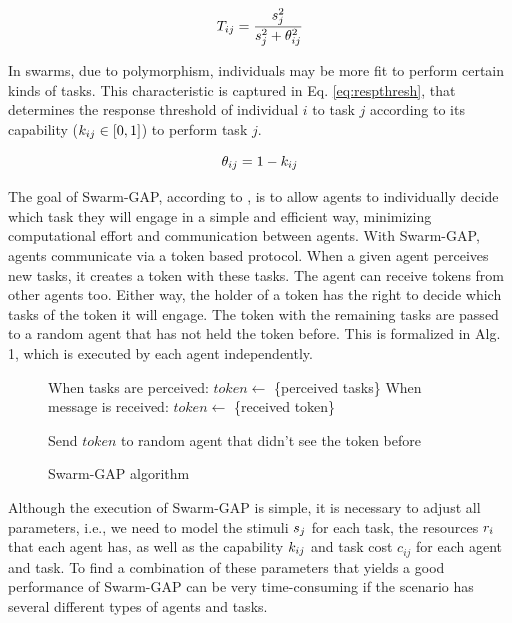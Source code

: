 \documentclass[conference]{IEEEtran}
\begin{document}
\begin{equation}
\label{eq:tendency}
\tendency{i}{j} = \frac{\stimulus{j}^2}{\stimulus{j}^2 + \respthresh{i}{j}^2}
\end{equation}

In swarms, due to polymorphism, individuals may be more fit to perform certain kinds of tasks. This characteristic is captured in Eq. \ref{eq:respthresh}, that determines the response threshold of individual $i$ to task $j$ according to its capability ($k_{ij} \in [0,1]$) to perform task $j$.

\begin{equation}
\label{eq:respthresh}
\respthresh{i}{j} = 1 - \agtcap{i}{j}
\end{equation}

The goal of Swarm-GAP, according to \cite{Ferreira+2008ccmms}, is to allow agents to individually decide which task they will engage in a simple and efficient way, minimizing computational effort and communication between agents. With Swarm-GAP, agents communicate via a token based protocol. When a given agent perceives new tasks, it creates a token with these tasks. The agent can receive tokens from other agents too. Either way, the holder of a token has the right to decide which tasks of the token it will engage. The token with the remaining tasks are passed to a random agent that has not held the token before. This is formalized in Alg. 1, which is executed by each agent independently.


\begin{figure}[ht]
\begin{algorithmic}
\STATE When tasks are perceived: $token \gets$ \{perceived tasks\}
\STATE When message is received: $token \gets$ \{received token\}

\ENDIF
\ENDFOR

\STATE Send $token$ to random agent that didn't see the token before
\end{algorithmic}
\caption{Swarm-GAP algorithm}
\end{figure}

Although the execution of Swarm-GAP is simple, it is necessary to adjust all parameters, i.e., we need to model the stimuli $s_j$ for each task, the resources $r_{i}$ that each agent has, as well as the capability $k_{ij}$ and task cost $c_{ij}$ for each agent and task. To find a combination of these parameters that yields a good performance of Swarm-GAP can be very time-consuming if the scenario has several different types of agents and tasks. 
\end{document}
